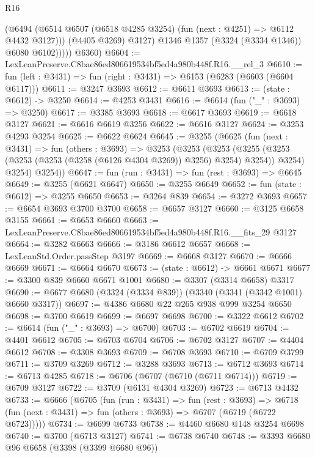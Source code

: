\begin{lexlean}{R16}
\begin{coremodule}
                  (@6494
                    (@6514 @6507 (@6518 @4285 @3254) (fun (next : @4251) => @6112 @4432 @3127)))
                  (@4405 @3269)
                  @3127)
                @1346
                @1357
                (@3324 (@3334 @1346))
                @6080
                @6102)))))
      @6360)
@6604 := LexLeanPreserve.C8bae86ed806619534bf5ed4a980b448f.R16.__rel_3
@6610 := fun (left : @3431) => fun (right : @3431) => @6153 (@6283 (@6603 (@6604 @6117)))
@6611 := @3247 @3693
@6612 := @6611 @3693
@6613 := (state : @6612) -> @3250
@6614 := @4253 @3431
@6616 := @6614 (fun ("_" : @3693) => @3250)
@6617 := @3385 @3693
@6618 := @6617 @3693
@6619 := @6618 @3127
@6621 := @6616 @6619 @3256
@6622 := @6616 @3127
@6624 := @3253 @4293 @3254
@6625 := @6622 @6624
@6645 := @3255
    (@6625
      (fun (next : @3431) =>
      fun (others : @3693) =>
      @3253
        (@3253
          (@3253
            (@3255 (@3253 (@3253 (@3253 (@3258 (@6126 @4304 @3269)) @3256) @3254) @3254))
            @3254)
          @3254)
        @3254))
@6647 := fun (run : @3431) => fun (rest : @3693) => @6645
@6649 := @3255 (@6621 @6647)
@6650 := @3255 @6649
@6652 := fun (state : @6612) => @3255 @6650
@6653 := @3264 @839
@6654 := @3272 @3693
@6657 := @6654 @3693 @3700 @3700
@6658 := @6657 @3127
@6660 := @3125 @6658 @3155
@6661 := @6653 @6660
@6663 := LexLeanPreserve.C8bae86ed806619534bf5ed4a980b448f.R16.__fits_29 @3127
@6664 := @3282 @6663
@6666 := @3186 @6612 @6657
@6668 := LexLeanStd.Order.passStep @3197
@6669 := @6668 @3127
@6670 := @6666 @6669
@6671 := @6664 @6670
@6673 := (state : @6612) -> @6661 @6671
@6677 := @3300 @839 @6660 @6671 @1001
@6680 := @3307 (@3314 @6658) @3317
@6690 := @6677 @6680 (@3324 (@3334 @839)) (@3340 (@3341 (@3342 @1001) @6660 @3317))
@6697 := @4386 @6680 @22 @265 @938 @999 @3254 @6650
@6698 := @3700 @6619
@6699 := @6697 @6698
@6700 := @3322 @6612
@6702 := @6614 (fun ("_" : @3693) => @6700)
@6703 := @6702 @6619
@6704 := @4401 @6612
@6705 := @6703 @6704
@6706 := @6702 @3127
@6707 := @4404 @6612
@6708 := @3308 @3693
@6709 := @6708 @3693
@6710 := @6709 @3799
@6711 := @3709 @3269
@6712 := @3288 @3693
@6713 := @6712 @3693
@6714 := @6713 @4285
@6718 := @6706 (@6707 (@6710 (@6711 @6714)))
@6719 := @6709 @3127
@6722 := @3709 (@6131 @4304 @3269)
@6723 := @6713 @4432
@6733 := @6666
    (@6705
      (fun (run : @3431) =>
      fun (rest : @3693) =>
      @6718 (fun (next : @3431) => fun (others : @3693) => @6707 (@6719 (@6722 @6723)))))
@6734 := @6699 @6733
@6738 := @4460 @6680 @148 @3254 @6698
@6740 := @3700 (@6713 @3127)
@6741 := @6738 @6740
@6748 := @3393 @6680 @96 @6658 (@3398 (@3399 @6680 @96))

\end{coremodule}
\end{lexlean}
